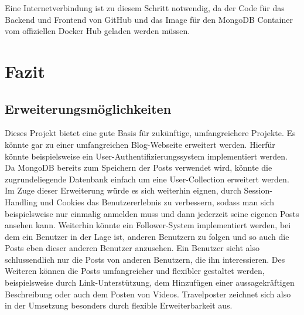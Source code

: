 \documentclass[12pt,a4paper]{report}
\begin{document}
Eine Internetverbindung ist zu diesem Schritt notwendig, da der Code für das Backend und Frontend von GitHub und das Image für den MongoDB Container vom offiziellen Docker Hub geladen werden müssen.

\newpage
\chapter{Fazit}
\section{Erweiterungsmöglichkeiten}
Dieses Projekt bietet eine gute Basis für zukünftige, umfangreichere Projekte. Es könnte gar zu einer umfangreichen Blog-Webseite erweitert werden. Hierfür könnte beispielsweise ein User-Authentifizierungssystem implementiert werden. Da MongoDB bereits zum Speichern der Posts verwendet wird, könnte die zugrundeliegende Datenbank einfach um eine User-Collection erweitert werden. Im Zuge dieser Erweiterung würde es sich weiterhin eignen, durch Session-Handling und Cookies das Benutzererlebnis zu verbessern, sodass man sich beispielsweise nur einmalig anmelden muss und dann jederzeit seine eigenen Posts ansehen kann. Weiterhin könnte ein Follower-System implementiert werden, bei dem ein Benutzer in der Lage ist, anderen Benutzern zu folgen und so auch die Posts eben dieser anderen Benutzer anzusehen. Ein Benutzer sieht also schlussendlich nur die Posts von anderen Benutzern, die ihn interessieren.
Des Weiteren können die Posts umfangreicher und flexibler gestaltet werden, beispielsweise durch Link-Unterstützung, dem Hinzufügen einer aussagekräftigen Beschreibung oder auch dem Posten von Videos. Travelposter zeichnet sich also in der Umsetzung besonders durch flexible Erweiterbarkeit aus.


%
\end{document}
